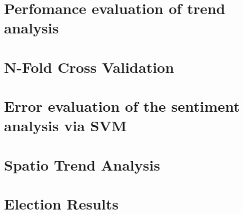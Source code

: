 \section{Perfomance evaluation of trend analysis}

\section{N-Fold Cross Validation}

\section{Error evaluation of the sentiment analysis via SVM}

\section{Spatio Trend Analysis}

\section{Election Results}

